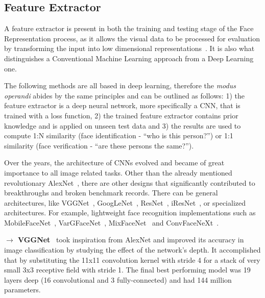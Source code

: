 \documentclass[class=report, crop=false, a4paper, 12pt]{standalone}
\begin{document}
\subsection{Feature Extractor}
A feature extractor is present in both the training and testing stage of the Face Representation process, as it allows the visual data to be processed for evaluation by transforming the input into low dimensional representations~\autocite{lecunGradientBasedLearningApplied1998}. It is also what distinguishes a Conventional Machine Learning approach from a Deep Learning one.  
\par The following methods are all based in deep learning, therefore the \textit{modus operandi} abides by the same principles and can be outlined as follows: 1) the feature extractor is a deep neural network, more specifically a CNN, that is trained with a loss function, 2) the trained feature extractor contains prior knowledge and is applied on unseen test data and 3) the results are used to compute 1:N similarity (face identification - ``who is this person?'') or 1:1 similarity (face verification - ``are these persons the same?'').
\par Over the years, the architecture of CNNs evolved and became of great importance to all image related tasks. Other than the already mentioned revolutionary AlexNet~\autocite{krizhevskyImageNetClassificationDeep2012}, there are other designs that significantly contributed to breakthroughs and broken benchmark records. There can be general architectures, like VGGNet~\autocite{simonyanVERYDEEPCONVOLUTIONAL2015}, GoogLeNet~\autocite{szegedyGoingDeeperConvolutions2014}, ResNet~\autocite{heDeepResidualLearning2016}, iResNet~\autocite{dutaImprovedResidualNetworks2021}, or specialized architectures. For example, lightweight face recognition implementations such as MobileFaceNet~\autocite{chenMobileFaceNetsEfficientCNNs2018}, VarGFaceNet~\autocite{yanVarGFaceNetEfficientVariable2019}, MixFaceNet~\autocite{boutrosMixFaceNetsExtremelyEfficient2021} and ConvFaceNeXt~\autocite{hooConvFaceNeXtLightweightNetworks2022}.

\vspace{\baselineskip}
\noindent\textbf{$\rightarrow$ VGGNet}~\autocite{simonyanVERYDEEPCONVOLUTIONAL2015} took inspiration from AlexNet and improved its accuracy in image classification by studying the effect of the network's depth. It accomplished that by substituting the 11x11 convolution kernel with stride 4 for a stack of very small 3x3 receptive field with stride 1. The final best performing model was 19 layers deep (16 convolutional and 3 fully-connected) and had 144 million parameters.
\end{document}
